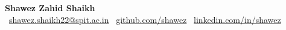 \documentclass[12pt]{article}
\begin{document}
\vspace*{0.5in}  %

\begin{center}
    {\LARGE \textbf{Shawez Zahid Shaikh}} \\
    \faEnvelope~\href{mailto:shawez.shaikh22@spit.ac.in}{shawez.shaikh22@spit.ac.in} \quad
    \faGithub~\href{https://github.com/shawez}{github.com/shawez} \quad
    \faLinkedin~\href{https://linkedin.com/in/shawez}{linkedin.com/in/shawez}
\end{center}
\end{document}

